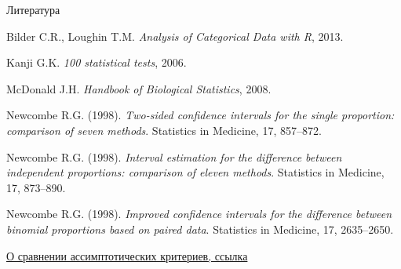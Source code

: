 \documentclass[9pt,pdf,utf8,hyperref={unicode},aspectratio=169]{beamer}
\begin{document}
\begin{frame}{Литература}
{{    Bilder C.R., Loughin T.M. \textit{Analysis of Categorical Data with R}, 2013.
		
	\vspace{5pt}

	Kanji G.K. \textit{100 statistical tests}, 2006.
	
	\vspace{5pt}	

    McDonald J.H. \textit{Handbook of Biological Statistics}, 2008.
		
	\vspace{5pt}

    Newcombe R.G. (1998). \textit{Two-sided confidence intervals for the single proportion: comparison of seven methods}. Statistics in Medicine, 17, 857–872.		
		
	\vspace{5pt}
	
	Newcombe R.G. (1998). \textit{Interval estimation for the difference between independent proportions: comparison of eleven methods}. Statistics in Medicine, 17, 873–890. 		
		
	\vspace{5pt}
		
	Newcombe R.G. (1998). \textit{Improved confidence intervals for the difference between binomial proportions based on paired data}. Statistics in Medicine, 17, 2635–2650.    		
    
    \vspace{5pt}
    \href{https://stats.idre.ucla.edu/other/mult-pkg/faq/general/faqhow-are-the-likelihood-ratio-wald-and-lagrange-multiplier-score-tests-different-andor-similar/}{О сравнении ассимптотических критериев, ссылка}
    }
    }
    
\end{frame}
\end{document}

